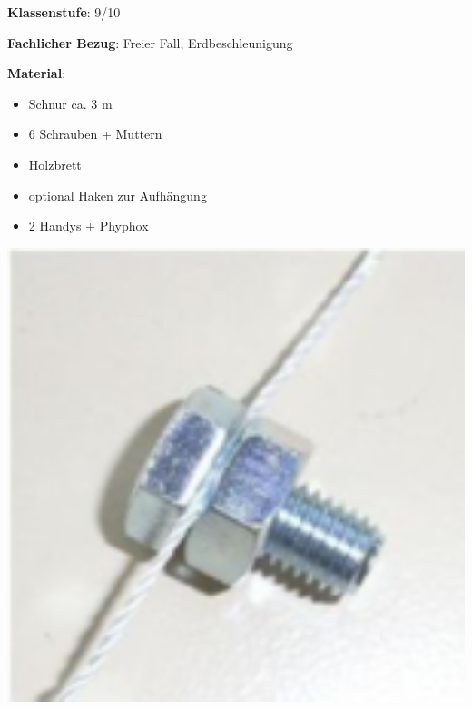 \documentclass[../main.tex]{subfiles}
\begin{document}
\begin{tcolorbox}[
    width=\textwidth,
    height=\textheight,
    title=Phyphox: Fallschnur,
    fonttitle=\Large,
    before title=\vspace{0.2cm}, after title=\vspace{0.2cm},
    colback=white,
    title filled=true, 
    colbacktitle=myorange,
    colframe=black,
    coltitle=black,
    ]

    \begin{minipage}[]{0.75\textwidth}
        \vspace{0.2cm}
        \textbf{Klassenstufe}: 9/10

        \vspace{0.4cm}

        \textbf{Fachlicher Bezug}: Freier Fall, Erdbeschleunigung

        \vspace{0.4cm}

        \begin{minipage}[]{0.65\textwidth}
            \textbf{Material}: 
            \begin{itemize}[noitemsep]
                \item Schnur ca. $3$ m
                \item 6 Schrauben + Muttern
                \item Holzbrett 
                \item optional Haken zur Aufhängung
                \item 2 Handys + Phyphox 
            \end{itemize}

        \end{minipage}
        \hspace{0.1cm}
        \begin{minipage}[]{0.3\textwidth}
            \vspace{0.5cm}
            \includegraphics[width=1\textwidth]{img/schraube}
        \end{minipage}


\end{minipage}
\end{tcolorbox}
\end{document}
